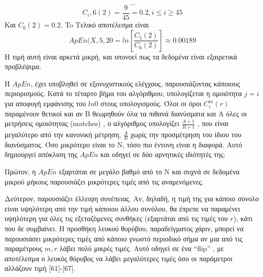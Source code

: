 \begin{equation}
	...
\end{equation}
\begin{equation}
	C_i,6 (2) = \frac{9}{45} = 0.2, i \leq i \geq 45
\end{equation}
Και $C_6 (2) = 0.2$. To Τελικό αποτέλεσμα είναι 
\begin{equation}
	ApEn(X, 5, 20 = ln[\frac{C_5 (2)}{C_6 (2)}] \approx 0.00189
\end{equation}
Η τιμή αυτή είναι αρκετά μικρή, και υπονοεί πως τα δεδομένα είναι εξαιρετικά προβλέψιμα.
\par
Η $ApEn$, έχει υποβληθεί σε εξονυχιστικούς ελέγχους, παρουσιάζοντας κάποιους περιορισμούς. Κατά το τέταρτο βήμα του αλγόριθμου, υπολογίζεται η ομοιότητα $j = i$ για αποφυγή εμφάνισης του $ln 0$ στους υπολογισμούς. Όλοι οι όροι $C_i ^m (r)$ παραμένουν θετικοί και αν Β θεωρηθούν όλα τα πιθανά διανύσματα και Α όλες οι μετρήσεις ομοιότητας \en (matches) \gr, ο αλγόριθμος υπολογίζει $\frac{A+1}{B+1}$ , που είναι μεγαλύτερο από την κανονική μέτρηση, $\frac{A}{B}$ χωρίς την προσμέτρηση του ίδιου του διανύσματος. Όσο μικρότερο είναι το Ν, τόσο πιο έντονη είναι η διαφορά. Αυτό δημιουργεί απόκλιση της $ApEn$ και οδηγεί σε δύο αρνητικές ιδιότητές της:
\par
Πρώτον, η $ApEn$ εξαρτάται σε μεγάλο βαθμό από το Ν και συχνά σε δεδομένα μικρού μήκους παρουσιάζει μικρότερες τιμές από τις αναμενόμενες.
\par
Δεύτερον, παρουσιάζει έλλειψη συνέπειας. Αν, δηλαδή, η τιμή της για κάποιο σύνολο είναι υψηλότερη από την τιμή κάποιου άλλου συνόλου, θα έπρεπε να παραμένει υψηλότερη για όλες τις εξεταζόμενες συνθήκες (εξαρτάται από τις τιμές του $r$), κάτι που δε συμβαίνει. Η προσθήκη λευκού θορύβου, παραδείγματος χάριν, μπορεί να παρουσιάσει μικρότερες τιμές από κάποιο γνωστό περιοδικό σήμα αν μια από τις παραμέτρους $m, r$ λάβει πολύ μικρές τιμές. Αυτό οδηγεί σε ένα \en “flip” \gr, με αποτέλεσμα ο λευκός θόρυβος να λάβει μεγαλύτερες τιμές όσο οι παράμετροι αλλάζουν τιμή [61]-[67].
